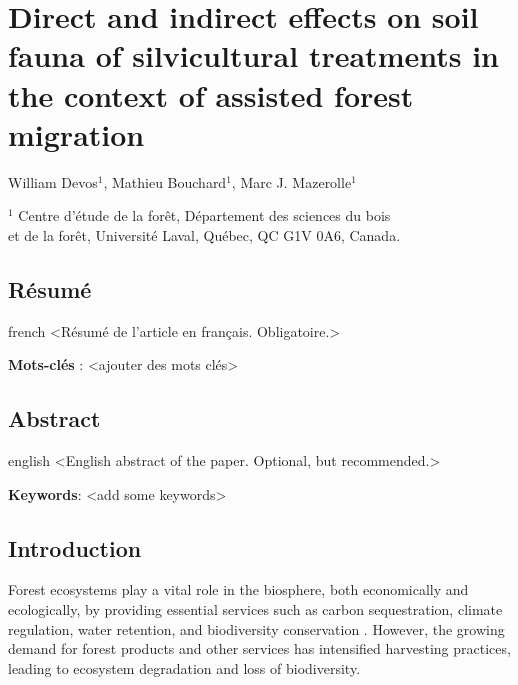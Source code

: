 \chapter{Direct and indirect effects on soil fauna of silvicultural treatments in the context of assisted forest migration}     %
\label{chapitre1-articles}    

William Devos$^1$, Mathieu Bouchard$^1$, Marc J. Mazerolle$^1$

$^1$ Centre d'étude de la forêt, Département des sciences du bois \\ 
et de la forêt, Université Laval, Québec, QC G1V 0A6, Canada. \\ 

\clearpage

\section*{Résumé}
\label{sec:resume1}

\begin{otherlanguage*}{french}
  <Résumé de l'article en français. Obligatoire.>

  \textbf{Mots-clés} : <ajouter des mots clés>
\end{otherlanguage*}

\clearpage

\section*{Abstract}
\label{sec:abstract1}

\begin{otherlanguage*}{english}
  <English abstract of the paper. Optional, but recommended.>

\textbf{Keywords}: <add some keywords> 
\end{otherlanguage*}

\cleardoublepage

\section*{Introduction}
\label{sec:intro2}

Forest ecosystems play a vital role in the biosphere, both economically and ecologically, by providing essential services such as carbon sequestration, climate regulation, water retention, and biodiversity conservation \citep{Balvanera2006Quantifyingevidence,Diaz2006BiodiversityLoss,Canadell2008Managingforests,Pawson2013Plantationforests}. 
However, the growing demand for forest products and other services has intensified harvesting practices, leading to ecosystem degradation and loss of biodiversity\citep{Bengtsson2000Biodiversitydisturbances,Sala2000Globalbiodiversity,Foley2005GlobalConsequences,Naeem2012functionsbiological}. 

